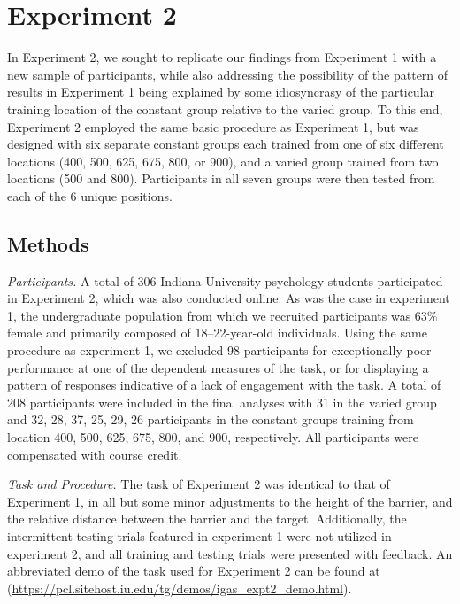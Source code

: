 \documentclass[
  man,floatsintext]{apa7}
\begin{document}
\hypertarget{experiment-2}{%
\section{Experiment 2}\label{experiment-2}}

In Experiment 2, we sought to replicate our findings from Experiment 1 with a new sample of participants, while also addressing the possibility of the pattern of results in Experiment 1 being explained by some idiosyncrasy of the particular training location of the constant group relative to the varied group. To this end, Experiment 2 employed the same basic procedure as Experiment 1, but was designed with six separate constant groups each trained from one of six different locations (400, 500, 625, 675, 800, or 900), and a varied group trained from two locations (500 and 800). Participants in all seven groups were then tested from each of the 6 unique positions.

\hypertarget{methods-1}{%
\subsection{Methods}\label{methods-1}}

\emph{Participants.} A total of 306 Indiana University psychology students participated in Experiment 2, which was also conducted online. As was the case in experiment 1, the undergraduate population from which we recruited participants was 63\% female and primarily composed of 18--22-year-old individuals. Using the same procedure as experiment 1, we excluded 98 participants for exceptionally poor performance at one of the dependent measures of the task, or for displaying a pattern of responses indicative of a lack of engagement with the task. A total of 208 participants were included in the final analyses with 31 in the varied group and 32, 28, 37, 25, 29, 26 participants in the constant groups training from location 400, 500, 625, 675, 800, and 900, respectively. All participants were compensated with course credit.

\emph{Task and Procedure.} The task of Experiment 2 was identical to that of Experiment 1, in all but some minor adjustments to the height of the barrier, and the relative distance between the barrier and the target. Additionally, the intermittent testing trials featured in experiment 1 were not utilized in experiment 2, and all training and testing trials were presented with feedback. An abbreviated demo of the task used for Experiment 2 can be found at (\url{https://pcl.sitehost.iu.edu/tg/demos/igas_expt2_demo.html}).
\end{document}
